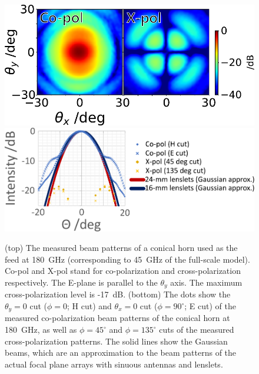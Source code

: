 \documentclass[journal]{IEEEtran}
\begin{document}
\begin{figure}[!t]
\centering
\includegraphics[width=0.9\linewidth]{Figures/FeedHornPattern.pdf}
\includegraphics[width=0.9\linewidth]{Figures/FeedHorn_vs_Lenslet.pdf}
\caption{%
(top) The measured beam patterns of a conical horn used as the feed at 180~GHz (corresponding to 45~GHz of the full-scale model). Co-pol and X-pol stand for co-polarization and cross-polarization respectively. The E-plane is parallel to the $\theta_y$ axis. The maximum cross-polarization level is -17~dB.
(bottom) The dots show the $\theta_y = 0$ cut ($\phi = 0$; H cut) and $\theta_x = 0$ cut ($\phi = 90^\circ$; E cut) of the measured co-polarization beam patterns of the conical horn at 180~GHz, as well as $\phi=45^\circ$ and $\phi=135^\circ$ cuts of the measured cross-polarization patterns. The solid lines show the Gaussian beams, which are an approximation to the beam patterns of the actual focal plane arrays with sinuous antennas and lenslets.
}
\label{fig:Feedhorn}
\end{figure}
%
%
\end{document}

